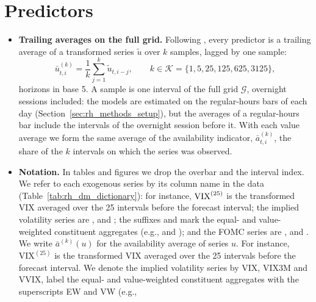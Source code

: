 \section{Predictors}
\label{sec:rh_predictors}
\begin{itemize}
\item \textbf{Trailing averages on the full grid.} Following \citet{Corsi2009}, every predictor is a trailing average
  of a transformed series $\tilde u$ over $k$ samples, lagged by one sample:
  \[
    \bar u^{(k)}_{t,i} = \frac{1}{k} \sum_{j=1}^{k} \tilde u_{t,i-j}, \qquad
    k \in \mathcal{K} = \{1, 5, 25, 125, 625, 3125\},
  \]
  \rhdmNHorizonsPooled{} horizons in base 5. A sample is one interval of the full grid $\mathcal{G}$, overnight
  sessions included: the models are estimated on the \rhorNBars{} regular-hours bars of each day
  (Section~\ref{sec:rh_methods_setup}), but the averages of a regular-hours bar include the intervals of the
  overnight session before it. With each value average we form the same average of the availability indicator,
  $\bar a^{(k)}_{t,i}$, the share of the $k$ intervals on which the series was observed.
\item \textbf{Notation.} In tables and figures we drop the overbar and the interval index.
  \ifrawseries
  We refer to each exogenous series by its column name in the data (Table~\ref{tab:rh_dm_dictionary}): for instance,
  $\ser{vix}{\mathrm{VIX}}^{(25)}$ is the transformed VIX averaged over the 25 intervals before the forecast
  interval; the implied volatility series are ,  and ; the suffixes
   and  mark the equal- and value-weighted constituent aggregates (e.g.,
   and ); and the FOMC series are ,
   and . We write $\bar a^{(k)}(u)$ for the availability average of
  series $u$.
  \else
  For instance, $\mathrm{VIX}^{(25)}$ is the transformed VIX averaged over the 25 intervals before the forecast
  interval. We denote the implied volatility series by $\mathrm{VIX}$, $\mathrm{VIX3M}$ and $\mathrm{VVIX}$, label
  the equal- and value-weighted constituent aggregates with the superscripts EW and VW (e.g.,

\end{itemize}
